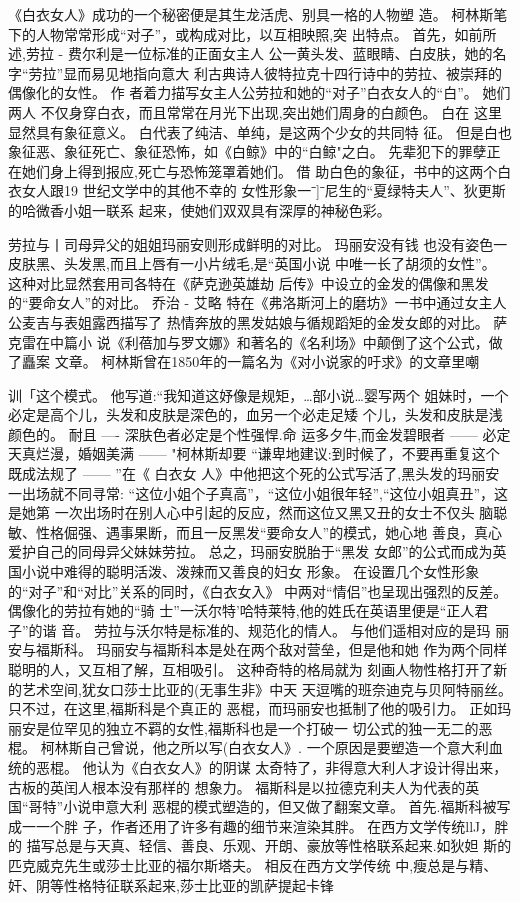 \documentclass[portrait,a4paper]{article}
\begin{document}
《白衣女人》成功的一个秘密便是其生龙活虎、别具一格的人物塑
造。 柯林斯笔下的人物常常形成“对子”，或构成对比，以互相映照,突
出特点。 首先，如前所述,劳拉 - 费尔利是一位标准的正面女主人
公一黄头发、蓝眼睛、白皮肤，她的名字“劳拉”显而易见地指向意大
利古典诗人彼特拉克十四行诗中的劳拉、被崇拜的偶像化的女性。 作
者着力描写女主人公劳拉和她的“对子”白衣女人的“白”。 她们两人
不仅身穿白衣，而且常常在月光下出现,突出她们周身的白颜色。 白在
这里显然具有象征意义。 白代表了纯洁、单纯，是这两个少女的共同特
征。 但是白也象征恶、象征死亡、象征恐怖，如《白鲸》中的“白鲸"之白。
先辈犯下的罪孽正在她们身上得到报应,死亡与恐怖笼罩着她们。 借
助白色的象征，书中的这两个白衣女人跟19 世纪文学中的其他不幸的
女性形象一ˉ]ˉ尼生的“夏绿特夫人”、狄更斯的哈微香小姐一联系
起来，使她们双双具有深厚的神秘色彩。

劳拉与丨司母异父的姐姐玛丽安则形成鲜明的对比。 玛丽安没有钱
也没有姿色一皮肤黑、头发黑,而且上唇有一小片绒毛,是“英国小说
中唯一长了胡须的女性”。 这种对比显然套用司各特在《萨克逊英雄劫
后传》中设立的金发的偶像和黑发的“要命女人”的对比。 乔治 - 艾略
特在《弗洛斯河上的磨坊》一书中通过女主人公麦吉与表姐露西描写了
热情奔放的黑发姑娘与循规蹈矩的金发女郎的对比。 萨克雷在中篇小
说《利蓓加与罗文娜》和著名的《名利场》中颠倒了这个公式，做了矗案
文章。 柯林斯曾在1850年的一篇名为《对小说家的吁求》的文章里嘲

训「这个模式。 他写道:“我知道这妤像是规矩，…部小说…婴写两个
姐妹时，一个必定是高个儿，头发和皮肤是深色的，血另一个必走足矮
个儿，头发和皮肤是浅颜色的。 耐且 ---- 深肤色者必定是个性强悍.命
运多夕牛,而金发碧眼者 ------ 必定天真烂漫，婚姻美满 ------ "柯林斯却要
“谦卑地建议:到时候了，不要再重复这个既成法规了 ------ ”在《 白衣女
人》中他把这个死的公式写活了,黑头发的玛丽安一出场就不同寻常:
“这位小姐个子真高”，“这位小姐很年轻”,“这位小姐真丑”，这是她第
一次出场时在别人心中引起的反应，然而这位又黑又丑的女士不仅头
脑聪敏、性格倔强、遇事果断，而且一反黑发“要命女人”的模式，她心地
善良，真心爱护自己的同母异父妹妹劳拉。 总之，玛丽安脱胎于“黑发
女郎”的公式而成为英国小说中难得的聪明活泼、泼辣而又善良的妇女
形象。
在设置几个女性形象的“对子”和“对比”关系的同时，《白衣女入》
中两对“情侣”也呈现出强烈的反差。 偶像化的劳拉有她的“骑
士”一沃尔特'哈特莱特,他的姓氏在英语里便是“正人君子”的谐
音。 劳拉与沃尔特是标准的、规范化的情人。 与他们遥相对应的是玛
丽安与福斯科。 玛丽安与福斯科本是处在两个敌对营垒，但是他和她
作为两个同样聪明的人，又互相了解，互相吸引。 这种奇特的格局就为
刻画人物性格打开了新的艺术空间,犹女口莎士比亚的(无事生非》中天
天逗嘴的班奈迪克与贝阿特丽丝。 只不过，在这里,福斯科是个真正的
恶棍，而玛丽安也抵制了他的吸引力。
正如玛丽安是位罕见的独立不羁的女性,福斯科也是一个打破一
切公式的独一无二的恶棍。 柯林斯自己曾说，他之所以写(白衣女人》.
一个原因是要塑造一个意大利血统的恶棍。 他认为《白衣女人》的阴谋
太奇特了，非得意大利人才设计得出来，古板的英闰人根本没有那样的
想象力。 福斯科是以拉德克利夫人为代表的英国“哥特”小说申意大利
恶棍的模式塑造的，但又做了翻案文章。 首先.福斯科被写成一一个胖
子，作者还用了许多有趣的细节来渲染其胖。 在西方文学传统llJ，胖的
描写总是与天真、轻信、善良、乐观、开朗、豪放等性格联系起来.如狄妲
斯的匹克威克先生或莎士比亚的福尔斯塔夫。 相反在西方文学传统
中,瘦总是与精、奸、阴等性格特征联系起来,莎士比亚的凯萨提起卡锋
\end{document}
